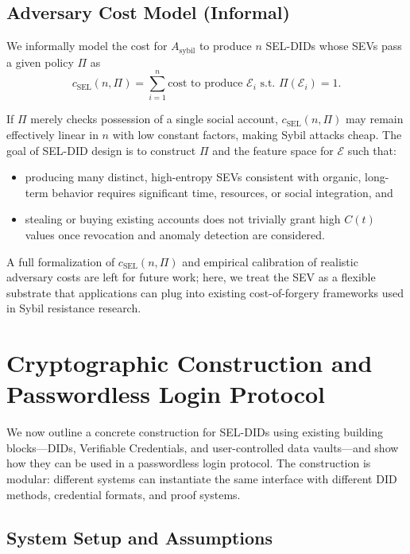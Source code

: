 \documentclass[11pt]{article}
\begin{document}
\subsection{Adversary Cost Model (Informal)}

We informally model the cost for $A_{\text{sybil}}$ to produce $n$ SEL-DIDs whose SEVs pass a given policy $\Pi$ as
\[
  c_{\text{SEL}}(n, \Pi) = \sum_{i=1}^{n} \text{cost to produce } \mathcal{E}_i \text{ s.t. } \Pi(\mathcal{E}_i) = 1.
\]

If $\Pi$ merely checks possession of a single social account, $c_{\text{SEL}}(n,\Pi)$ may remain effectively linear in $n$ with low constant factors, making Sybil attacks cheap. The goal of SEL-DID design is to construct $\Pi$ and the feature space for $\mathcal{E}$ such that:

\begin{itemize}
  \item producing many distinct, high-entropy SEVs consistent with organic, long-term behavior requires significant time, resources, or social integration, and
  \item stealing or buying existing accounts does not trivially grant high $C(t)$ values once revocation and anomaly detection are considered.
\end{itemize}

A full formalization of $c_{\text{SEL}}(n,\Pi)$ and empirical calibration of realistic adversary costs are left for future work; here, we treat the SEV as a flexible substrate that applications can plug into existing cost-of-forgery frameworks used in Sybil resistance research.

\label{sec:threat2}


\section{Cryptographic Construction and Passwordless Login Protocol}
\label{sec:construction}

We now outline a concrete construction for SEL-DIDs using existing building blocks---DIDs, Verifiable Credentials, and user-controlled data vaults---and show how they can be used in a passwordless login protocol. The construction is modular: different systems can instantiate the same interface with different DID methods, credential formats, and proof systems.

\subsection{System Setup and Assumptions}
\end{document}
